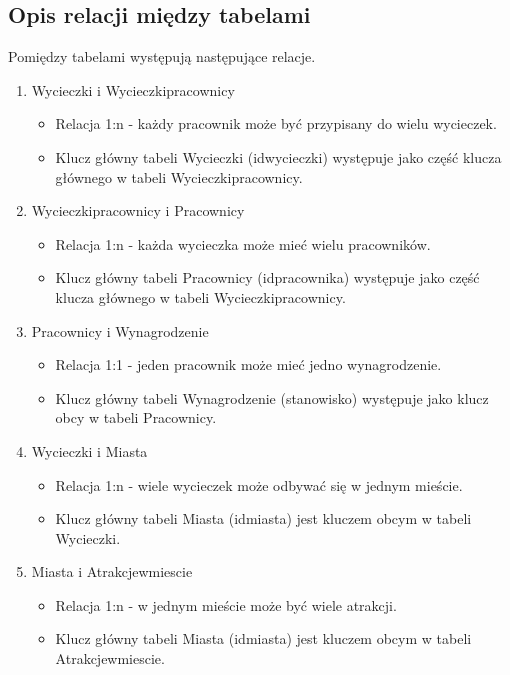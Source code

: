 \documentclass{article}
\begin{document}
	\subsection{Opis relacji między tabelami}
	
	Pomiędzy tabelami występują następujące relacje.
	
	\begin{enumerate}
		
		\item Wycieczki i Wycieczki\textunderscore pracownicy
		\begin{itemize}
			\item Relacja 1:n - każdy pracownik może być przypisany do wielu wycieczek.
			\item Klucz główny tabeli Wycieczki (id\textunderscore wycieczki) występuje jako część klucza głównego w tabeli Wycieczki\textunderscore pracownicy.
		\end{itemize}
		 
		\item Wycieczki\textunderscore pracownicy i Pracownicy
		\begin{itemize}
			\item Relacja 1:n - każda wycieczka może mieć wielu pracowników.
			\item Klucz główny tabeli Pracownicy (id\textunderscore pracownika) występuje jako część klucza głównego w tabeli Wycieczki\textunderscore pracownicy.
		\end{itemize}
	
		\item Pracownicy i Wynagrodzenie
		\begin{itemize}
			\item Relacja 1:1 - jeden pracownik może mieć jedno wynagrodzenie.
			\item Klucz główny tabeli Wynagrodzenie (stanowisko) występuje jako klucz obcy w tabeli Pracownicy.
		\end{itemize}

		\item Wycieczki i Miasta
		\begin{itemize}
			\item Relacja 1:n - wiele wycieczek może odbywać się w jednym mieście.
			\item Klucz główny tabeli Miasta (id\textunderscore miasta) jest kluczem obcym w tabeli Wycieczki.
		\end{itemize}
		
		\item Miasta i Atrakcje\textunderscore w\textunderscore miescie
		\begin{itemize}
			\item Relacja 1:n - w jednym mieście może być wiele atrakcji.
			\item Klucz główny tabeli Miasta (id\textunderscore miasta) jest kluczem obcym w tabeli Atrakcje\textunderscore w\textunderscore miescie.
		\end{itemize}
		

\end{enumerate}
\end{document}
